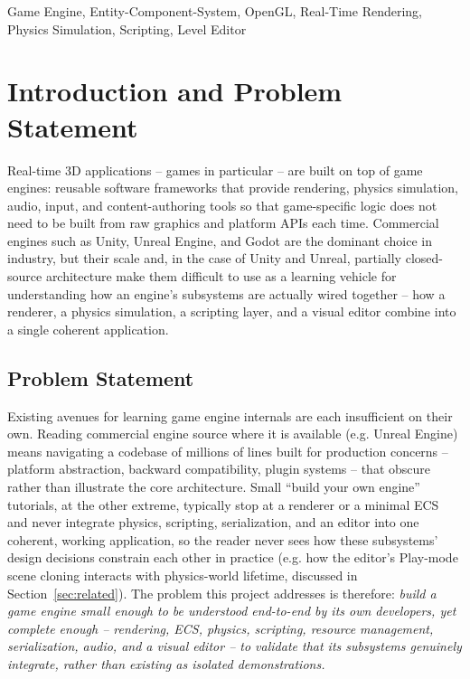 \documentclass[conference]{IEEEtran}
\begin{document}
\begin{IEEEkeywords}
Game Engine, Entity-Component-System, OpenGL, Real-Time Rendering,
Physics Simulation, Scripting, Level Editor
\end{IEEEkeywords}

\section{Introduction and Problem Statement}

Real-time 3D applications -- games in particular -- are built on top of
game engines: reusable software frameworks that provide rendering,
physics simulation, audio, input, and content-authoring tools so that
game-specific logic does not need to be built from raw graphics and
platform APIs each time. Commercial engines such as Unity, Unreal
Engine, and Godot are the dominant choice in industry, but their scale
and, in the case of Unity and Unreal, partially closed-source
architecture make them difficult to use as a learning vehicle for
understanding how an engine's subsystems are actually wired together --
how a renderer, a physics simulation, a scripting layer, and a visual
editor combine into a single coherent application.

\subsection{Problem Statement}
\label{sec:problem}

Existing avenues for learning game engine internals are each
insufficient on their own. Reading commercial engine source where it is
available (e.g. Unreal Engine) means navigating a codebase of millions
of lines built for production concerns -- platform abstraction,
backward compatibility, plugin systems -- that obscure rather than
illustrate the core architecture. Small ``build your own engine''
tutorials, at the other extreme, typically stop at a renderer or a
minimal ECS and never integrate physics, scripting, serialization, and
an editor into one coherent, working application, so the reader never
sees how these subsystems' design decisions constrain each other in
practice (e.g. how the editor's Play-mode scene cloning interacts with
physics-world lifetime, discussed in Section~\ref{sec:related}). The
problem this project addresses is therefore: \emph{build a game engine
small enough to be understood end-to-end by its own developers, yet
complete enough -- rendering, ECS, physics, scripting, resource
management, serialization, audio, and a visual editor -- to validate
that its subsystems genuinely integrate, rather than existing as
isolated demonstrations.}
\end{document}
